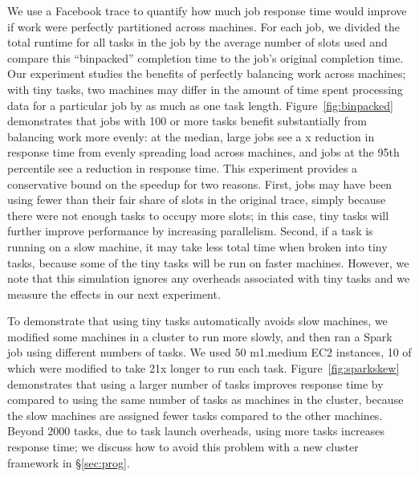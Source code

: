 We use a Facebook trace to quantify how much job response time would
improve if work were perfectly partitioned across machines.
For each job, we divided the total runtime for all tasks in the
job by the average number of slots used and compare this ``binpacked''
completion time to the job's original completion time.
Our experiment studies the benefits of perfectly balancing
work across machines; with tiny tasks, two machines may differ in the amount of
time spent processing data for a particular job by as much as one task
length.
Figure~\ref{fig:binpacked}
demonstrates that jobs with 100 or more tasks benefit substantially from
balancing work more evenly: at the median, large jobs see
a x reduction in response time from evenly spreading load
across machines, and
jobs at the 95th percentile see a  reduction in response time.
This experiment provides a conservative bound on the speedup for two reasons. First, jobs
may have been using fewer than their fair share of slots in the original trace,
simply because there were not enough tasks to occupy more slots; in this case,
tiny tasks will further improve performance by increasing parallelism. Second,
if a task is running on a slow machine, it may take less total time when
broken into tiny tasks, because some of the tiny tasks will be run on faster
machines. However, we note that this simulation ignores any overheads associated with 
tiny tasks and we measure the effects in our next experiment.



To demonstrate that using tiny tasks automatically avoids slow machines,
we modified some machines in a cluster to run more slowly, and then
ran a Spark~\cite{zaharia2010spark} job using different numbers of tasks. 
We used $50$ m1.medium EC2
instances, 10 of which were modified to take 21x longer to run each task.
Figure~\ref{fig:sparkskew} demonstrates that using a larger number of tasks
improves response time by  compared to using the same number
of tasks as machines in the cluster, because the slow machines are
assigned fewer tasks
compared to the other machines. Beyond $2000$ tasks, due to
task launch overheads, using more tasks increases response time; we discuss
how to avoid this problem with a new cluster framework in \S\ref{sec:prog}.


